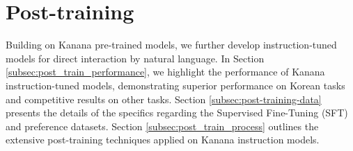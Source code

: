 \section{Post-training}

Building on Kanana pre-trained models, we further develop instruction-tuned models for direct interaction by natural language.
In Section \ref{subsec:post_train_performance}, we highlight the performance of Kanana instruction-tuned models, demonstrating superior performance on Korean tasks and competitive results on other tasks.
Section \ref{subsec:post-training-data} presents the details of the specifics regarding the Supervised Fine-Tuning (SFT) and preference datasets.
Section \ref{subsec:post_train_process} outlines the extensive post-training techniques applied on Kanana instruction models.





